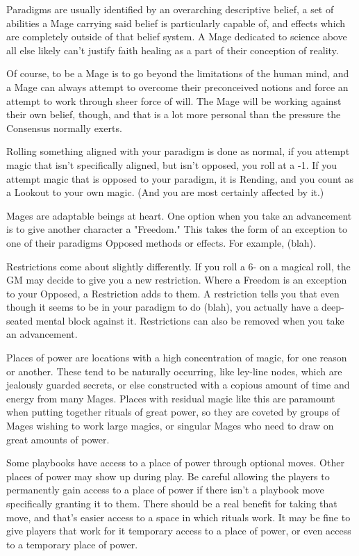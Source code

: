 \documentclass[letterpaper,12pt]{article}
\newcommand{\SECTION}[1]{\vspace{.5em}{\noindent\titlefont\large\textbf{#1}}

}
\begin{document}
Paradigms are usually identified by an overarching descriptive belief,
a set of abilities a Mage carrying said belief is particularly capable
of, and effects which are completely outside of that belief system. A
Mage dedicated to science above all else likely can't justify faith
healing as a part of their conception of reality.

Of course, to be a Mage is to go beyond the limitations of the human
mind, and a Mage can always attempt to overcome their preconceived
notions and force an attempt to work through sheer force of will. The
Mage will be working against their own belief, though, and that is a
lot more personal than the pressure the Consensus normally exerts.

Rolling something aligned with your paradigm is done as normal, if you
attempt magic that isn't specifically aligned, but isn't opposed, you
roll at a -1. If you attempt magic that is opposed to your paradigm,
it is Rending, and you count as a Lookout to your own magic. (And you
are most certainly affected by it.)

\SECTION{Freedoms and Restrictions}
Mages are adaptable beings at heart. One option when you take an
advancement is to give another character a "Freedom." This takes the
form of an exception to one of their paradigms Opposed methods or 
effects. For example, (blah).

Restrictions come about slightly differently. If you roll a 6- on a
magical roll, the GM may decide to give you a new restriction. Where a
Freedom is an exception to your Opposed, a Restriction adds to them. 
A restriction tells you that even though it seems to be in your paradigm 
to do (blah), you actually have a deep-seated mental block against it.
Restrictions can also be removed when you take an advancement.

\SECTION{Place of Power}
Places of power are locations with a high concentration of magic, for
one reason or another. These tend to be naturally occurring, like
ley-line nodes, which are jealously guarded secrets, or else
constructed with a copious amount of time and energy from many
Mages. Places with residual magic like this are paramount when putting
together rituals of great power, so they are coveted by groups of
Mages wishing to work large magics, or singular Mages who need to draw
on great amounts of power.

Some playbooks have access to a place of power through optional
moves. Other places of power may show up during play. Be careful
allowing the players to permanently gain access to a place of power if
there isn't a playbook move specifically granting it to them. There
should be a real benefit for taking that move, and that's easier
access to a space in which rituals work. It may be fine to give
players that work for it temporary access to a place of power, or even
access to a temporary place of power.
\end{document}
